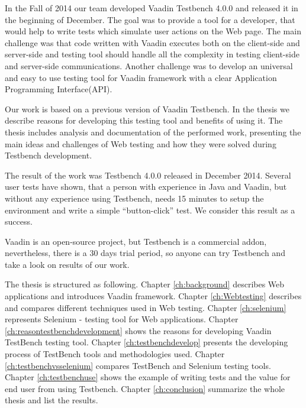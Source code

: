 	 In the Fall of 2014 our team developed Vaadin Testbench
	 4.0.0 and released it in the beginning of December. The goal was to provide a
	 tool for a developer, that would help to write tests which simulate user
	 actions on the Web page. The main challenge was that code written with Vaadin
	 executes both on the client-side and server-side and testing tool should handle all the complexity
	 in testing client-side and server-side communications. Another challenge was
	 to develop an universal and easy to use testing tool for Vaadin framework with a
	 clear Application Programming Interface(API).
	 
	 Our work is based on a previous version of Vaadin Testbench. In the thesis
	 we describe reasons for developing this testing tool and benefits of using it.
	 The thesis includes analysis and documentation of the performed work,
	 presenting the main ideas and challenges of Web testing and how they were
	 solved during Testbench development.
	 
	 The result of the work was Testbench 4.0.0 released in December 2014.
	 Several user tests have shown, that a person with experience in Java and
	 Vaadin, but without any experience using Testbench, needs 15 minutes to setup
	 the environment and write a simple ``button-click'' test. We consider this
	 result as a success.
	  
	 Vaadin is an open-source project, but Testbench is a commercial
	 addon, nevertheless, there is a 30 days trial period, so anyone
	 can try Testbench and take a look on results of our work.
	  
	  \iffalse
		  I will also , because Testbench is focused on testing Web
		 applications written with Vaadin. I will also describe the working flow, what
		 tools and methodologies the team used and how the final product helps
		 Vaadin developers.
	  \fi 

	  The thesis is structured as following. Chapter \ref{ch:background} describes
	  Web applications and introduces Vaadin framework. Chapter \ref{ch:Webtesting}
	  describes and compares different techniques used in Web testing. Chapter
	  \ref{ch:selenium} represents Selenium - testing tool for Web applications.
	  Chapter \ref{ch:reasontestbenchdevelopment} shows the reasons for
	  developing Vaadin TestBench testing tool. Chapter \ref{ch:testbenchdevelop} presents the developing process of TestBench tools and methodologies used.
	  Chapter \ref{ch:testbenchvsselenium} compares TestBench and Selenium testing
	  tools. Chapter \ref{ch:testbenchuse} shows the example of writing tests and
	  the value for end user from using Testbench. 
	  Chapter \ref{ch:conclusion} summarize the whole thesis and list the results.